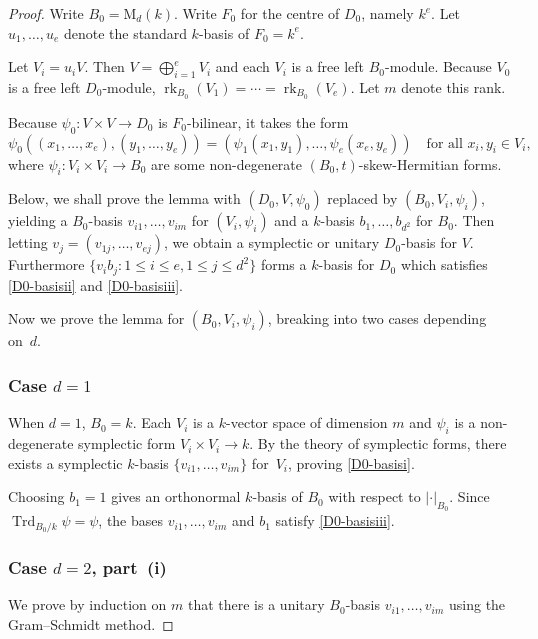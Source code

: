 \documentclass[JEP,XML,SOM,Unicode,NoFloatCountersInSection]{cedram}
\newcommand{\rM}{\mathrm{M}}
\DeclareMathOperator{\rk}{rk}
\DeclareMathOperator{\Trd}{Trd}
\newcommand{\abs}[1]{\lvert #1 \rvert}
\begin{document}
\begin{proof}
Write $B_0 = \rM_d(k)$.
Write $F_0$ for the centre of $D_0$, namely $k^e$.
Let $u_1, \dotsc, u_e$ denote the standard $k$-basis of $F_0 = k^e$.

Let $V_i = u_i V$.
Then $V = \bigoplus_{i=1}^e V_i$ and each $V_i$ is a free left $B_0$-module.
Because $V_0$ is a free left $D_0$-module, $\rk_{B_0}(V_1) = \dotsb = \rk_{B_0}(V_e)$.
Let $m$ denote this rank.

Because $\psi_0 : V \times V \to D_0$ is $F_0$-bilinear, it takes the form
\[
\psi_0((x_1, \dotsc, x_e), (y_1, \dotsc, y_e)) = (\psi_1(x_1, y_1), \dotsc, \psi_e(x_e, y_e)) \quad\text{for all } x_i, y_i \in V_i,
\]
where $\psi_i \colon V_i \times V_i \to B_0$ are some non-degenerate $(B_0, t)$-skew-Hermitian forms.

Below, we shall prove the lemma with $(D_0, V, \psi_0)$ replaced by $(B_0, V_i, \psi_i)$, yielding a $B_0$-basis $v_{i1}, \dotsc, v_{im}$ for $(V_i, \psi_i)$ and a $k$-basis $b_1, \dotsc, b_{d^2}$ for $B_0$.
Then letting \hbox{$v_j = (v_{1j}, \dotsc, v_{ej})$}, we obtain a symplectic or unitary $D_0$-basis for $V$.
Furthermore $\{ v_i b_j : 1 \leq i \leq e, 1 \leq j \leq d^2 \}$ forms a $k$-basis for $D_0$ which satisfies \eqref{D0-basisii} and \eqref{D0-basisiii}.

Now we prove the lemma for $(B_0, V_i, \psi_i)$, breaking into two cases depending on~$d$.

\subsubsection*{Case $d=1$}
When $d=1$, $B_0=k$.
Each $V_i$ is a $k$-vector space of dimension $m$ and $\psi_i$ is a non-degenerate symplectic form $V_i \times V_i \to k$.
By the theory of symplectic forms, there exists a symplectic $k$-basis $\{ v_{i1}, \dotsc, v_{im} \}$ for~$V_i$, proving \eqref{D0-basisi}.

Choosing $b_1 = 1$ gives an orthonormal $k$-basis of $B_0$ with respect to $\abs{\cdot}_{B_0}$.
Since $\Trd_{B_0/k} \psi = \psi$, the bases $v_{i1}, \dotsc, v_{im}$ and $b_1$ satisfy \eqref{D0-basisiii}.

\subsubsection*{Case $d=2$, part~(i)}
We prove by induction on $m$ that there is a unitary $B_0$-basis $v_{i1}, \dotsc, v_{im}$ using the Gram--Schmidt method.


\end{proof}
\end{document}
